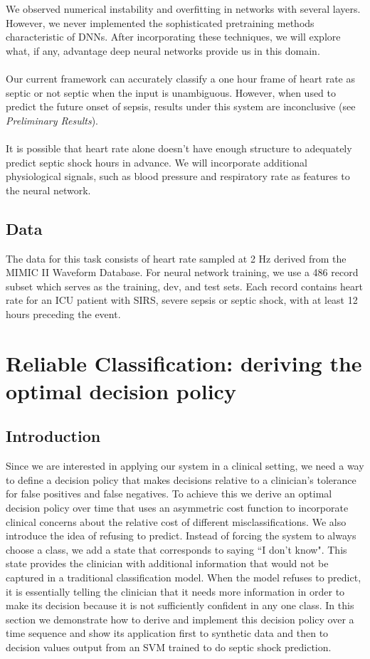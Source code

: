 \documentclass[12pt,solutions]{article}
\begin{document}
We observed numerical instability and overfitting in networks with several layers. However, we never implemented the sophisticated pretraining
methods characteristic of DNNs. After incorporating these techniques, we will explore what, if any, advantage deep neural networks provide
us in this domain.
\\
\\
Our current framework can accurately classify a one hour frame of heart rate as septic or not septic when the input is unambiguous. However,
when used to predict the future onset of sepsis, results under this system are inconclusive (see \textit{Preliminary Results}).
\\
\\
It is possible that heart rate alone doesn't have enough structure to adequately predict septic shock hours in advance. We will incorporate
additional physiological signals, such as blood pressure and respiratory rate as features to the neural network.

\subsection{Data}

The data for this task consists of heart rate sampled at 2 Hz derived from the MIMIC II Waveform Database. For neural network training, we use a 486 record subset which 
serves as the training, dev, and test sets. 
Each record contains heart rate for an ICU patient with SIRS, severe sepsis or septic shock, with at least
12 hours preceding the event.

\section{Reliable Classification: deriving the optimal decision policy}

\subsection{Introduction}
Since we are interested in applying our system in a clinical setting, we need a way to define a decision policy that makes decisions relative to a clinician's tolerance for false positives and false negatives. To achieve this we derive an optimal decision policy over time that uses an asymmetric cost function to incorporate clinical concerns about the relative cost of different misclassifications. We also introduce the idea of refusing to predict. Instead of forcing the system to always choose a class, we add a state that corresponds to saying ``I don't know". This state provides the clinician with additional information that would not be captured in a traditional classification model. When the model refuses to predict, it is essentially telling the clinician that it needs more information in order to make its decision because it is not sufficiently confident in any one class. In this section we demonstrate how to derive and implement this decision policy over a time sequence and show its application first to synthetic data and then to decision values output from an SVM trained to do septic shock prediction.
\end{document}
